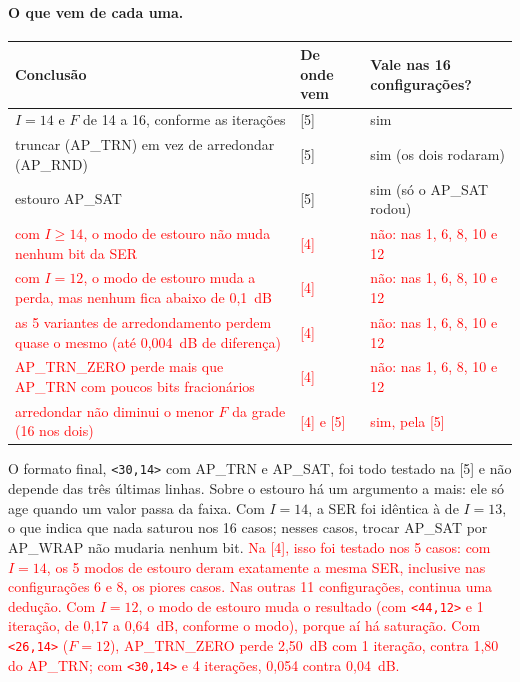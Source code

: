 \documentclass[11pt]{article}
\newcommand{\novo}[1]{\textcolor{red}{#1}}
\begin{document}
\paragraph{O que vem de cada uma.}
\begin{center}
\small
\renewcommand{\arraystretch}{1.15}
\begin{tabular}{|l|l|l|}
\hline
Conclusão & De onde vem & Vale nas 16 configurações? \\
\hline
$I = 14$ e $F$ de 14 a 16, conforme as iterações & [5] & sim \\
truncar (AP\_TRN) em vez de arredondar (AP\_RND) & [5] & sim (os dois rodaram) \\
estouro AP\_SAT & [5] & sim (só o AP\_SAT rodou) \\
\novo{com $I \ge 14$, o modo de estouro não muda nenhum bit da SER} & \novo{[4]} & \novo{não: nas 1, 6, 8, 10 e 12} \\
\novo{com $I = 12$, o modo de estouro muda a perda, mas nenhum fica abaixo de 0,1~dB} & \novo{[4]} & \novo{não: nas 1, 6, 8, 10 e 12} \\
\novo{as 5 variantes de arredondamento perdem quase o mesmo (até 0,004~dB de diferença)} & \novo{[4]} & \novo{não: nas 1, 6, 8, 10 e 12} \\
\novo{AP\_TRN\_ZERO perde mais que AP\_TRN com poucos bits fracionários} & \novo{[4]} & \novo{não: nas 1, 6, 8, 10 e 12} \\
\novo{arredondar não diminui o menor $F$ da grade (16 nos dois)} & \novo{[4] e [5]} & \novo{sim, pela [5]} \\
\hline
\end{tabular}
\end{center}
O formato final, \texttt{<30,14>} com AP\_TRN e AP\_SAT, foi todo testado na [5] e não depende das
três últimas linhas. Sobre o estouro há um argumento a mais: ele só age quando um valor passa da
faixa. Com $I = 14$, a SER foi idêntica à de $I = 13$, o que indica que nada saturou nos 16 casos;
nesses casos, trocar AP\_SAT por AP\_WRAP não mudaria nenhum bit. \novo{Na [4], isso foi testado nos 5 casos: com $I = 14$, os 5 modos de estouro deram
exatamente a mesma SER, inclusive nas configurações 6 e 8, os piores casos. Nas outras 11
configurações, continua uma dedução. Com $I = 12$, o modo de estouro muda o resultado (com
\texttt{<44,12>} e 1 iteração, de 0,17 a 0,64~dB, conforme o modo), porque aí há saturação.
Com \texttt{<26,14>} ($F = 12$), AP\_TRN\_ZERO perde 2,50~dB com 1 iteração, contra 1,80 do
AP\_TRN; com \texttt{<30,14>} e 4 iterações, 0,054 contra 0,04~dB.}
\end{document}
